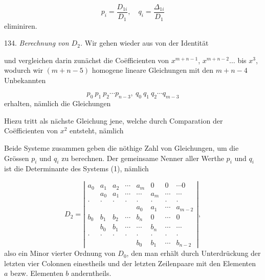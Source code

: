 \[
p_i = \frac{D_{1i}}{D_1},\quad q_i = \frac{\Delta_{1i}}{D_1}
\]
eliminiren.

134. \textit{Berechnung von $D_2$.} Wir gehen wieder aus von der Identität


und vergleichen darin zunächst die Co\"efficienten von $x^{m+n-1}$, $x^{m+n-2}\ldots$ bis $x^3$, wodurch wir $(m+n-5)$ homogene lineare Gleichungen mit den $m+n-4$ Unbekannten

\[
p_0\ p_1\ p_2 \cdots p_{n-3},\ q_0\ q_1\ q_2 \cdots q_{m-3}
\]
erhalten, nämlich die Gleichungen


Hiezu tritt als nächste Gleichung jene, welche durch Comparation der Co\"efficienten von $x^2$ entsteht, nämlich




Beide Systeme zusammen geben die nöthige Zahl von Gleichungen, um die Grössen $p_i$ und $q_i$ zu berechnen. Der gemeinsame Nenner aller Werthe $p_i$ und $q_i$ ist die Determinante des Systems (1), nämlich

\[
D_2 =
\left|
\begin{array}{cccccccc}
a_0 & a_1 & a_2 & \cdots & a_m & 0 & 0 & \cdots 0\\
 & a_0 & a_1 & \cdots & \cdots & a_m & \cdots & \cdots\\
 \cdot & \cdot & \cdot & \cdot & \cdot & \cdot & \cdot & \cdot\\
 & & & & a_0 & a_1 & \cdots & a_{m-2}\\
b_0 & b_1 & b_2 & \cdots & b_n & 0 & \cdots & 0\\
 & b_0 & b_1 & \cdots & \cdots & b_n & \cdots & \cdots\\
 \cdot & \cdot & \cdot & \cdot & \cdot & \cdot & \cdot & \cdot\\
 & & & & b_0 & b_1 & \cdots & b_{n-2}
\end{array}
\right|,
\]
also ein Minor vierter Ordnung von $D_0$, den man erhält durch Unterdrückung der letzten vier Colonnen einestheils und der letzten Zeilenpaare mit den Elementen $a$ bezw. Elementen $b$ anderntheils.

